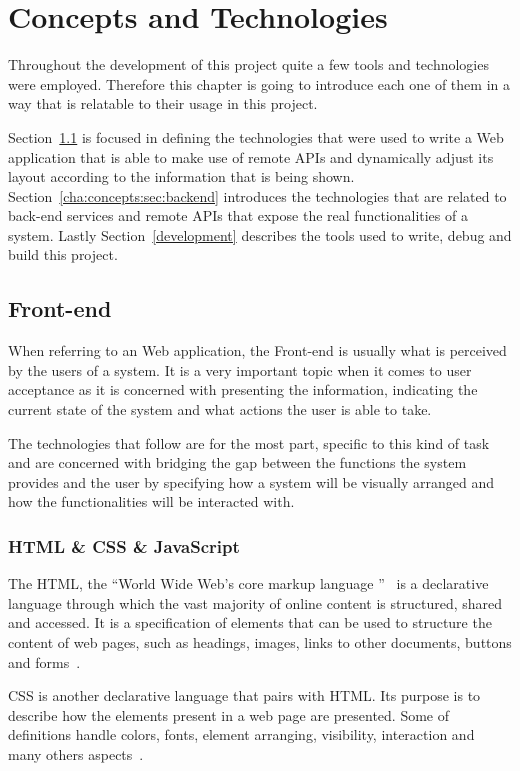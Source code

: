 \chapter{Concepts and Technologies}\label{cha:concepts}
Throughout the development of this project quite a few tools and technologies were employed. Therefore this chapter is going to introduce each one of them in a way that is relatable to their usage in this project.

Section~\ref{cha:concepts:sec:frontend} is focused in defining the technologies that were used to write a Web application that is able to make use of remote \gls{API}s and dynamically adjust its layout according to the information that is being shown.
Section~\ref{cha:concepts:sec:backend} introduces the technologies that are related to back-end services and remote \gls{API}s that expose the real functionalities of a system. Lastly Section~\ref{development} describes the tools used to write, debug and build this project.

\section{Front-end}\label{cha:concepts:sec:frontend}
When referring to an Web application, the Front-end is usually what is perceived by the users of a system. It is a very important topic when it comes to user acceptance as it is concerned with presenting the information, indicating the current state of the system and what actions the user is able to take.

The technologies that follow are for the most part, specific to this kind of task and are concerned with bridging the gap between the functions the system provides and the user by specifying how a system will be visually arranged and how the functionalities will be interacted with.


\subsection{HTML \& CSS \& JavaScript}
The \gls{HTML}, the ``World Wide Web's core markup language ''~\cite{html} is a declarative language through which the vast majority of online content is structured, shared and accessed. It is a specification of elements that can be used to structure the content of web pages, such as headings, images, links to other documents, buttons and forms~\cite{htmlcss}.

\gls{CSS} is another declarative language that pairs with HTML. Its purpose is to describe how the elements present in a web page are presented.
Some of definitions handle colors, fonts, element arranging, visibility, interaction and many others aspects~\cite{htmlcss}.

